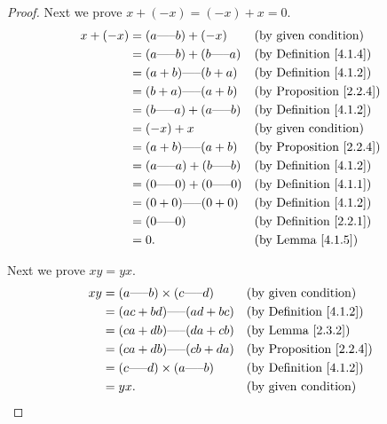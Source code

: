 \begin{proof}
Next we prove \(x + (-x) = (-x) + x = 0\).
\begin{align*}
x + (-x) &= (a \text{-----} b) + (-x) && \text{(by given condition)} \\
&= (a \text{-----} b) + (b \text{-----} a) && \text{(by Definition \ref{4.1.4})} \\
&= (a + b) \text{-----} (b + a) && \text{(by Definition \ref{4.1.2})} \\
&= (b + a) \text{-----} (a + b) && \text{(by Proposition \ref{2.2.4})} \\
&= (b \text{-----} a) + (a \text{-----} b) && \text{(by Definition \ref{4.1.2})} \\
&= (-x) + x && \text{(by given condition)} \\
&= (a + b) \text{-----} (a + b) && \text{(by Proposition \ref{2.2.4})} \\
&= (a \text{-----} a) + (b \text{-----} b) && \text{(by Definition \ref{4.1.2})} \\
&= (0 \text{-----} 0) + (0 \text{-----} 0) && \text{(by Definition \ref{4.1.1})} \\
&= (0 + 0) \text{-----} (0 + 0) && \text{(by Definition \ref{4.1.2})} \\
&= (0 \text{-----} 0) && \text{(by Definition \ref{2.2.1})} \\
&= 0. && \text{(by Lemma \ref{4.1.5})}
\end{align*}

Next we prove \(xy = yx\).
\begin{align*}
xy &= (a \text{-----} b) \times (c \text{-----} d) && \text{(by given condition)} \\
&= (ac + bd) \text{-----} (ad + bc) && \text{(by Definition \ref{4.1.2})} \\
&= (ca + db) \text{-----} (da + cb) && \text{(by Lemma \ref{2.3.2})} \\
&= (ca + db) \text{-----} (cb + da) && \text{(by Proposition \ref{2.2.4})} \\
&= (c \text{-----} d) \times (a \text{-----} b) && \text{(by Definition \ref{4.1.2})} \\
&= yx. && \text{(by given condition)}
\end{align*}


\end{proof}
